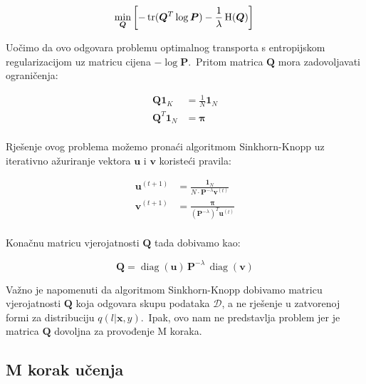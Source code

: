 \documentclass[diplomskirad]{fer}
\begin{document}
\begin{equation}
    \min_{\bm{Q}} \left[-\operatorname{tr}(\bm{Q}^T \log \bm{P}) - \frac{1}{\lambda} \operatorname{H}(\bm{Q}) \right] \\ 
  \label{eq:vibe_e_reversed}
\end{equation}

Uočimo da ovo odgovara problemu optimalnog transporta s entropijskom regularizacijom uz matricu cijena $-\log \bm{P}$.\ Pritom matrica $\bm{Q}$ mora zadovoljavati ograničenja:

\begin{equation}
  \begin{aligned}
    \bm{Q} \bm{1}_K &= \frac{1}{N} \bm{1}_N \\
    \bm{Q}^T \bm{1}_N &= \bm{\pi} \\
  \end{aligned}
\label{eq:vibe_q_matrix_restrictions}
\end{equation}

\pagebreak

Rješenje ovog problema možemo pronaći algoritmom Sinkhorn-Knopp uz iterativno ažuriranje vektora $\bm{u}$ i $\bm{v}$ koristeći pravila:

\begin{equation}
  \begin{aligned}
    \bm{u}^{(t + 1)} &= \frac{\bm{1}_N}{N \cdot \bm{P}^{-\lambda} \bm{v}^{(t)}} \\
    \bm{v}^{(t + 1)} &= \frac{\bm{\pi}}{(\bm{P}^{-\lambda})^T \bm{u}^{(t)}} \\
  \end{aligned}
  \label{eq:vibe_sk_rules}
\end{equation}

Konačnu matricu vjerojatnosti $\bm{Q}$ tada dobivamo kao:

\begin{equation}
  \bm{Q} = \operatorname{diag}(\bm{u})\,\bm{P}^{-\lambda}\,\operatorname{diag}(\bm{v})
  \label{eq:vibe_q_formula}
\end{equation}

Važno je napomenuti da algoritmom Sinkhorn-Knopp dobivamo matricu vjerojatnosti $\bm{Q}$ koja odgovara skupu podataka $\mathcal{D}$, a ne rješenje u zatvorenoj formi za distribuciju $q(l | \bm{x}, y)$.\ 
Ipak, ovo nam ne predstavlja problem jer je matrica $\bm{Q}$ dovoljna za provođenje M koraka.\

\subsection{M korak učenja}
\label{sub:m_step}
\end{document}

